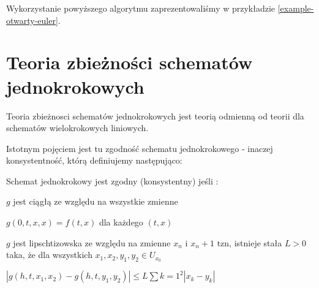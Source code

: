 \documentclass[12pt,a4paper]{report}
\begin{document}
Wykorzystanie powyższego algorytmu zaprezentowaliśmy w przykładzie \ref{example-otwarty-euler}.

\section{Teoria zbieżności schematów jednokrokowych}

Teoria zbieżnosci schematów jednokrokowych jest teorią odmienną od teorii dla schematów wielokrokowych liniowych. 

Istotnym pojęciem jest tu zgodność schematu jednokrokowego - inaczej konsystentność, którą definiujemy następująco: 

\begin{definition} \label{def-zgodnosc}

Schemat jednokrokowy jest zgodny (konsystentny) jeśli :

\item $g$ jest ciągłą ze względu na wszystkie zmienne
\item $g(0,t,x,x) = f(t,x)$ dla każdego $(t,x)$
\item $g$ jest lipschtizowska ze względu na zmienne $x_n$ i $x_n+1$ tzn, istnieje stała $L>0$ taka, że dla wszystkich $x_1,x_2,y_1,y_2 \in U_x_0$

$|g(h,t,x_1,x_2) - g(h,t,y_1,y_2)| \leq L\sum{k=1}^{2}|x_k - y_k|$
\end{definition}
\end{document}
